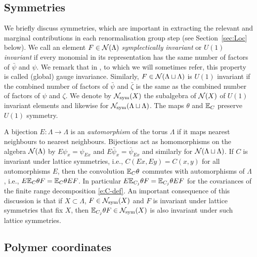 \documentclass[11pt]{amsart}
\numberwithin{equation}{section}
\numberwithin{theorem}{section}
\newcommand{\1}{{\bf 1}}
\begin{document}
\subsection{Symmetries}
\label{sec:symmetries}


We briefly discuss symmetries, which are important in extracting the
relevant and marginal contributions in each renormalisation group step
(see Section~\ref{sec:Loc} below).  We call an element
$F \in \mathcal N(\Lambda)$ \emph{symplectically invariant} or
\emph{$U(1)$ invariant} if every monomial in its representation has
the same number of factors of $\bar\psi$ and $\psi$.  We remark that
in \cite{MR3332938,MR3332939}, to which we will sometimes refer,
this property is called (global) gauge invariance. Similarly,
$F \in \mathcal N(\Lambda\sqcup\Lambda)$ is $U(1)$ invariant if the
combined number of factors of $\bar\psi$ and $\bar\zeta$ is the same
as the combined number of factors of $\psi$ and $\zeta$.  We denote by
$\mathcal N_{\rm sym}(X)$ the subalgebra of $\mathcal N(X)$ of $U(1)$
invariant elements and likewise for
$\mathcal N_{\rm sym}(\Lambda\sqcup\Lambda)$.  The maps $\theta$ and $\mathbb{E}_{C}$
preserve $U(1)$ symmetry.

A bijection $E\colon \Lambda\to\Lambda$ is an \emph{automorphism}
of the torus $\Lambda$ if it
maps nearest neighbours to nearest neighbours. Bijections act as homomorphisms
on the algebra $\mathcal N(\Lambda)$ by $E\psi_x = \psi_{Ex}$ and
$E\bar\psi_x = \bar\psi_{Ex}$ and similarly for
$\mathcal N(\Lambda\sqcup\Lambda)$. If $C$ is invariant under lattice
symmetries, i.e., $C(Ex,Ey)=C(x,y)$ for all automorphisms
$E$, then the convolution $\mathbb{E}_C\theta$ commutes
with automorphisms of $\Lambda$, i.e.,
$E \mathbb{E}_{C}\theta F = \mathbb{E}_{C}\theta E F$. In particular $E\mathbb{E}_{C_{j}}\theta
F = \mathbb{E}_{C_{j}}\theta E F$ for the covariances of the finite range decomposition
\eqref{e:C-def}.
%
An important consequence of this discussion is that if
$X\subset \Lambda$, $F\in \mathcal N_{\rm sym}(X)$ and $F$ is
invariant under lattice symmetries that fix $X$, then
$\mathbb{E}_{C_{j}}\theta F\in \mathcal N_{\rm sym}(X)$ is also invariant
under such lattice symmetries.


\subsection{Polymer coordinates}
\label{sec:polymers}
\end{document}
